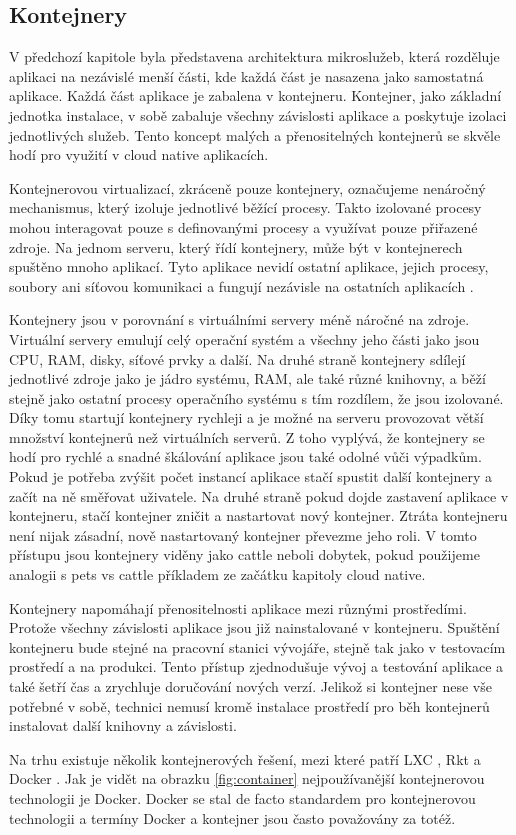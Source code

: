 \subsection{Kontejnery}
V předchozí kapitole byla představena architektura mikroslužeb, která rozděluje aplikaci na nezávislé menší části, kde každá část je nasazena jako samostatná aplikace. Každá část aplikace je zabalena v kontejneru. Kontejner, jako základní jednotka instalace, v sobě zabaluje všechny závislosti aplikace a poskytuje izolaci jednotlivých služeb. Tento koncept malých a přenositelných kontejnerů se skvěle hodí pro využití v cloud native aplikacích. \par
Kontejnerovou virtualizací, zkráceně pouze kontejnery, označujeme nenáročný \linebreak mechanismus, který izoluje jednotlivé běžící procesy. Takto izolované procesy mohou interagovat pouze s definovanými procesy a využívat pouze přiřazené zdroje. Na jednom serveru, který řídí kontejnery, může být v kontejnerech spuštěno mnoho aplikací. Tyto aplikace nevidí ostatní aplikace, jejich procesy, soubory ani síťovou komunikaci a fungují nezávisle na ostatních aplikacích \cite{docsopenshift}. \par
Kontejnery jsou v porovnání s virtuálními servery méně náročné na zdroje. Virtuální servery emulují celý operační systém a všechny jeho části jako jsou CPU, RAM, disky, síťové prvky a další. Na druhé straně kontejnery sdílejí jednotlivé zdroje jako je jádro systému, RAM, ale také různé knihovny, a běží stejně jako ostatní procesy operačního systému s tím rozdílem, že jsou izolované. Díky tomu startují kontejnery rychleji a je možné na serveru provozovat větší množství kontejnerů než virtuálních serverů. \linebreak Z toho vyplývá, že kontejnery se hodí pro rychlé a snadné škálování aplikace jsou také odolné vůči výpadkům. Pokud je potřeba zvýšit počet instancí aplikace stačí spustit další kontejnery a začít na ně směřovat uživatele. Na druhé straně pokud dojde zastavení aplikace v kontejneru, stačí kontejner zničit a nastartovat nový kontejner. Ztráta kontejneru není nijak zásadní, nově nastartovaný kontejner převezme jeho roli. V tomto přístupu jsou kontejnery viděny jako cattle neboli dobytek, pokud použijeme analogii s pets vs cattle příkladem ze začátku kapitoly cloud native. \par
Kontejnery napomáhají přenositelnosti aplikace mezi různými prostředími. Protože všechny závislosti aplikace jsou již nainstalované v kontejneru. Spuštění kontejneru bude stejné na pracovní stanici vývojáře, stejně tak jako v testovacím prostředí a na produkci. Tento přístup zjednodušuje vývoj a testování aplikace a také šetří čas a zrychluje doručování nových verzí. Jelikož si kontejner nese vše potřebné v sobě, technici nemusí kromě instalace prostředí pro běh kontejnerů instalovat další knihovny a závislosti. \par
Na trhu existuje několik kontejnerových řešení, mezi které patří LXC \cite{lxc},  Rkt\cite{rkt} a Docker \cite{docker}. Jak je vidět na obrazku \ref{fig:container} nejpoužívanější kontejnerovou technologii je Docker. Docker se stal de facto standardem pro kontejnerovou technologii a termíny Docker a kontejner jsou často považovány za totéž. 

